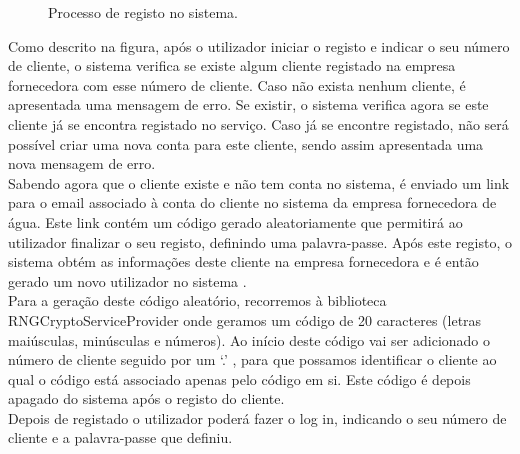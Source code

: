 \begin{figure}[h!]
\begin{center}
\caption{Processo de registo no sistema.}
\label{fig:registo}
\end{center}
\end{figure}

Como descrito na figura, após o utilizador iniciar o registo e indicar o seu número de cliente, o sistema verifica se existe algum cliente registado na empresa fornecedora com esse número de cliente. Caso não exista nenhum cliente, é apresentada uma mensagem de erro. Se existir, o sistema verifica agora se este cliente já se encontra registado no serviço. Caso já se encontre registado, não será possível criar uma nova conta para este cliente, sendo assim apresentada uma nova mensagem de erro.\\
Sabendo agora que o cliente existe e não tem conta no sistema, é enviado um link para o email associado à conta do cliente no sistema da empresa fornecedora de água. Este link contém um código gerado aleatoriamente que permitirá ao utilizador finalizar o seu registo, definindo uma palavra-passe. Após este registo, o sistema obtém as informações deste cliente na empresa fornecedora e é então gerado um novo utilizador no sistema .\\
Para a geração deste código aleatório, recorremos à biblioteca RNGCryptoServiceProvider \cite{RNGCryptoServiceProvider} onde geramos um código de 20 caracteres (letras maiúsculas, minúsculas e números). Ao início deste código vai ser adicionado o número de cliente seguido por um ‘.’ , para que possamos identificar o cliente ao qual o código está associado apenas pelo código em si. Este código é depois apagado do sistema após o registo do cliente.\\
Depois de registado o utilizador poderá fazer o log in, indicando o seu número de cliente e a palavra-passe que definiu. 

